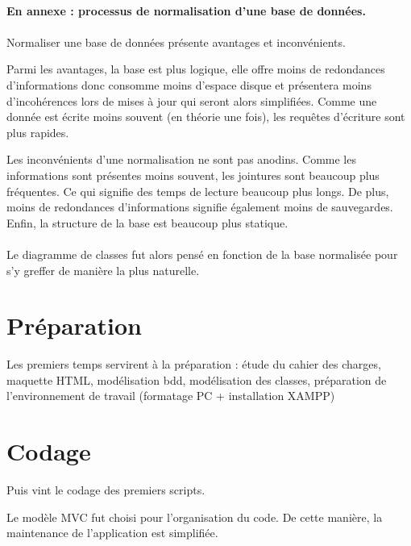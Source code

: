 \documentclass[a4paper,12pt,titlepage]{report}
\begin{document}
\paragraph*{}
\textbf{En annexe : processus de normalisation d'une base de données.}

\newpage

\paragraph*{}
Normaliser une base de données présente avantages et inconvénients.


Parmi les avantages, la base est plus logique, elle offre moins de redondances d'informations donc consomme moins d'espace disque et présentera moins d'incohérences lors de mises à jour qui seront alors simplifiées. Comme une donnée est écrite moins souvent (en théorie une fois), les requêtes d'écriture sont plus rapides.

Les inconvénients d'une normalisation ne sont pas anodins. Comme les informations sont présentes moins souvent, les jointures sont beaucoup plus fréquentes. Ce qui signifie des temps de lecture beaucoup plus longs. De plus, moins de redondances d'informations signifie également moins de sauvegardes. Enfin, la structure de la base est beaucoup plus statique.

\paragraph*{}
Le diagramme de classes fut alors pensé en fonction de la base normalisée pour s'y greffer de manière la plus naturelle.



\section{Préparation}

Les premiers temps servirent à la préparation : étude du cahier des charges, maquette HTML, modélisation bdd, modélisation des classes, préparation de l'environnement de travail (formatage PC + installation XAMPP)

\newpage

\section{Codage}

Puis vint le codage des premiers scripts.

Le modèle MVC fut choisi pour l'organisation du code. De cette manière, la maintenance de l'application est simplifiée.
\end{document}
